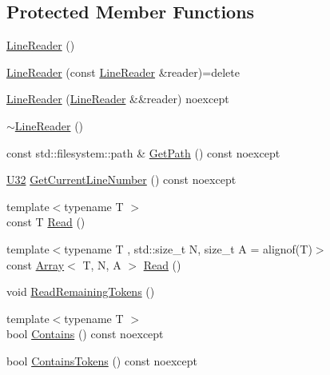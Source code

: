 \subsection*{Protected Member Functions}
\begin{DoxyCompactItemize}
\item 
\mbox{\hyperlink{classmage_1_1_line_reader_ab4a46321d7ea3ecda2d6390c78a7285b}{Line\+Reader}} ()
\item 
\mbox{\hyperlink{classmage_1_1_line_reader_ae4f871bebae110704b34c0bd88460639}{Line\+Reader}} (const \mbox{\hyperlink{classmage_1_1_line_reader}{Line\+Reader}} \&reader)=delete
\item 
\mbox{\hyperlink{classmage_1_1_line_reader_ae90c546a98e113a48ca1c94b854a4866}{Line\+Reader}} (\mbox{\hyperlink{classmage_1_1_line_reader}{Line\+Reader}} \&\&reader) noexcept
\item 
\mbox{\hyperlink{classmage_1_1_line_reader_ad9753ea392ebe5b3867852d3392fb1e7}{$\sim$\+Line\+Reader}} ()
\item 
const std\+::filesystem\+::path \& \mbox{\hyperlink{classmage_1_1_line_reader_a9740b3cecdcf5a27c696a08eef3b09da}{Get\+Path}} () const noexcept
\item 
\mbox{\hyperlink{namespacemage_aa5d6eaabaac3cdd01873d6a3d27e90f3}{U32}} \mbox{\hyperlink{classmage_1_1_line_reader_aa0ed768e2799b74f2341c56fc6ac4969}{Get\+Current\+Line\+Number}} () const noexcept
\item 
{\footnotesize template$<$typename T $>$ }\\const T \mbox{\hyperlink{classmage_1_1_line_reader_a9bbad433ab93ce012aec7155adafbedb}{Read}} ()
\item 
{\footnotesize template$<$typename T , std\+::size\+\_\+t N, size\+\_\+t A = alignof(\+T)$>$ }\\const \mbox{\hyperlink{structmage_1_1_array}{Array}}$<$ T, N, A $>$ \mbox{\hyperlink{classmage_1_1_line_reader_a208eb25a7715761178317eec72c93c75}{Read}} ()
\item 
void \mbox{\hyperlink{classmage_1_1_line_reader_aa12f309eaa7aace705ff4e0199c4fbfc}{Read\+Remaining\+Tokens}} ()
\item 
{\footnotesize template$<$typename T $>$ }\\bool \mbox{\hyperlink{classmage_1_1_line_reader_a89a31254af144fd0c9e7f684cdaa28e7}{Contains}} () const noexcept
\item 
bool \mbox{\hyperlink{classmage_1_1_line_reader_aeb88e4082cfe3ae1ff84a82fcde26298}{Contains\+Tokens}} () const noexcept
\end{DoxyCompactItemize}
